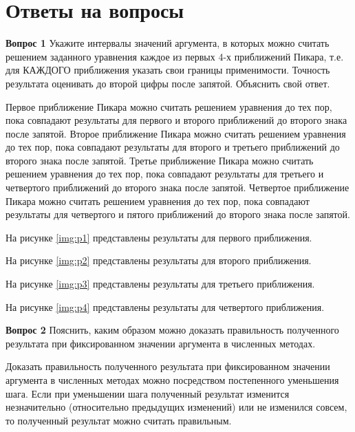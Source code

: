 \section{Ответы на вопросы}


\textbf{Вопрос 1} Укажите интервалы значений аргумента, в которых можно считать решением заданного уравнения каждое из первых 4-х приближений Пикара, т.е. для КАЖДОГО приближения указать свои границы применимости. Точность результата оценивать до второй цифры после запятой. Объяснить свой ответ.
	
Первое приближение Пикара можно считать решением уравнения до тех пор, пока совпадают результаты для первого и второго приближений до второго знака после запятой. Второе приближение Пикара можно считать решением уравнения до тех пор, пока совпадают результаты для второго и третьего приближений до второго знака после запятой. Третье приближение Пикара можно считать решением уравнения до тех пор, пока совпадают результаты для третьего и четвертого приближений до второго знака после запятой. Четвертое приближение Пикара можно считать решением уравнения до тех пор, пока совпадают результаты для четвертого и пятого приближений до второго знака после запятой.

На рисунке \ref{img:p1} представлены результаты для первого приближения.

\newpage

На рисунке \ref{img:p2} представлены результаты для второго приближения.

\newpage

На рисунке \ref{img:p3} представлены результаты для третьего приближения.

\newpage

На рисунке \ref{img:p4} представлены результаты для четвертого приближения.

\newpage


\textbf{Вопрос 2} Пояснить, каким образом можно доказать правильность полученного результата при фиксированном значении аргумента в численных методах. 

Доказать правильность полученного результата при фиксированном значении аргумента в численных методах можно посредством постепенного уменьшения шага. Если при уменьшении шага полученный результат изменится незначительно (относительно предыдущих изменений) или не изменился совсем, то полученный результат можно считать правильным.

